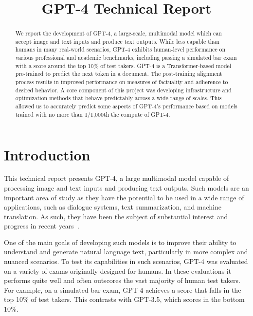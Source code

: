 \title{GPT-4 Technical Report}

\begin{abstract}
We report the development of GPT-4, a large-scale, multimodal model which can accept image and text inputs and produce text outputs. While less capable than humans in many real-world scenarios, GPT-4 exhibits human-level performance on various professional and academic benchmarks, including passing a simulated bar exam with a score around the top 10\% of test takers. GPT-4 is a Transformer-based model pre-trained to predict the next token in a document. The post-training alignment process results in improved performance on measures of factuality and adherence to desired behavior. A core component of this project was developing infrastructure and optimization methods that behave predictably across a wide range of scales. This allowed us to accurately predict some aspects of GPT-4's performance based on models trained with no more than 1/1,000th the compute of GPT-4.
\end{abstract}

\section{Introduction}

This technical report presents GPT-4, a large multimodal model capable of processing image and text inputs and producing text outputs. Such models are an important area of study as they have the potential to be used in a wide range of applications, such as dialogue systems, text summarization, and machine translation. As such, they have been the subject of substantial interest and progress in recent years~\citep{brown2020language,hoffmann2022training,chowdhery2022palm,rae2021scaling,dai2019transformer,liu2019roberta,devlin2018bert,raffel2019exploring,shazeer2018adafactor,ba2016layer,wei2022chain,huang2022selfimprovement,kojima2022zeroshotreasoner,kaplan2020scaling,henighan2020scaling,yang2022tensor,shazeer2017outrageously,zoph2022stmoe,wei2022emergent,dehghani2018universal,su2021roformer,alayracflamingo,chen2022pali,wang2021gpt,black2021gpt,scao2022bloom,zhang2022opt,touvron2023llama,radford2017sentiment,lample2019crosslingual,dao2022flashattention,child2019generating,rabe2021selfattention,Gray2017GPUKF}.

One of the main goals of developing such models is to improve their ability to understand and generate natural language text, particularly in more complex and nuanced scenarios. To test its capabilities in such scenarios, GPT-4 was evaluated on a variety of exams originally designed for humans. In these evaluations it performs quite well and often outscores the vast majority of human test takers. For example, on a simulated bar exam, GPT-4 achieves a score that falls in the top 10\% of test takers. This contrasts with GPT-3.5, which scores in the bottom 10\%. 

